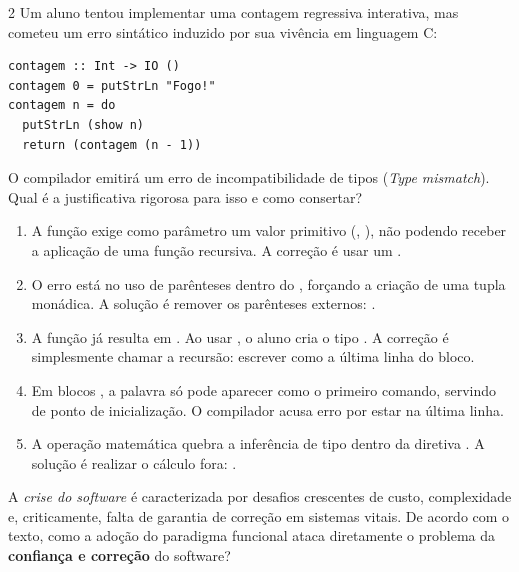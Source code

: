 \documentclass[a4paper,10pt,brazil]{article}
\begin{document}
\begin{multicols}{2}
Um aluno tentou implementar uma contagem regressiva interativa, mas cometeu um erro sintático induzido por sua vivência em linguagem C:

\begin{verbatim}
contagem :: Int -> IO ()
contagem 0 = putStrLn "Fogo!"
contagem n = do
  putStrLn (show n)
  return (contagem (n - 1))
\end{verbatim}

O compilador emitirá um erro de incompatibilidade de tipos (\emph{Type mismatch}). Qual é a justificativa rigorosa para isso e como consertar?

\begin{enumerate}
  \item A função  exige como parâmetro um valor primitivo (, ), não podendo receber a aplicação de uma função recursiva. A correção é usar um .

  \item O erro está no uso de parênteses dentro do , forçando a criação de uma tupla monádica. A solução é remover os parênteses externos: .

  \item A função  já resulta em . Ao usar , o aluno cria o tipo . A correção é simplesmente chamar a recursão: escrever  como a última linha do bloco.

  \item Em blocos , a palavra  só pode aparecer como o primeiro comando, servindo de ponto de inicialização. O compilador acusa erro por estar na última linha.

  \item A operação matemática  quebra a inferência de tipo dentro da diretiva . A solução é realizar o cálculo fora: .

\end{enumerate}

A \emph{crise do software} é caracterizada por desafios crescentes de custo, complexidade e, criticamente, falta de garantia de correção em sistemas vitais. De acordo com o texto, como a adoção do paradigma funcional ataca diretamente o problema da \textbf{confiança e correção} do software?


\end{multicols}
\end{document}
